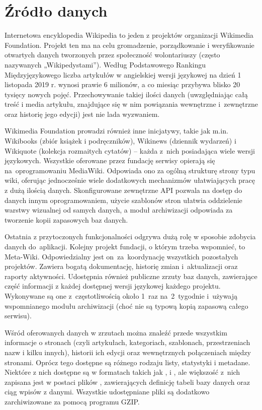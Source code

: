 \section{Źródło danych}
\label{sec:data-source}
Internetowa encyklopedia Wikipedia to jeden z projektów organizacji Wikimedia Foundation. Projekt ten ma na celu gromadzenie, porządkowanie i weryfikowanie otwartych danych tworzonych przez społeczność wolontariuszy (często nazywanych „Wikipedystami”). Według Podstawowego Rankingu Międzyjęzykowego \cite{Wiki:PodstawowyRanking} liczba artykułów w angielskiej wersji językowej na dzień 1 listopada 2019 r. wynosi prawie 6 milionów, a co miesiąc przybywa blisko 20 tysięcy nowych pojęć. Przechowywanie takiej ilości danych (uwzględniając całą treść i media artykułu, znajdujące się w nim powiązania wewnętrzne i~zewnętrzne oraz historię jego edycji) jest nie lada wyzwaniem.

Wikimedia Foundation prowadzi również inne inicjatywy, takie jak m.in. Wikibooks (zbiór książek i podręczników), Wikinews (dziennik wydarzeń) i Wikiquote (kolekcja rozmaitych cytatów) – każda z~nich posiadająca wiele wersji językowych. Wszystkie oferowane przez fundację serwisy opierają się na~oprogramowaniu MediaWiki. Odpowiada ono za ogólną strukturę strony typu wiki, oferując jednocześnie wiele dodatkowych mechanizmów ułatwiających pracę z dużą ilością danych. Skonfigurowane zewnętrzne API pozwala na dostęp do danych innym oprogramowaniem, użycie szablonów stron ułatwia oddzielenie warstwy wizualnej od samych danych, a moduł archiwizacji odpowiada za tworzenie kopii zapasowych baz danych.

Ostatnia z przytoczonych funkcjonalności odgrywa dużą rolę w sposobie zdobycia danych do~aplikacji. Kolejny projekt fundacji, o którym trzeba wspomnieć, to Meta-Wiki. Odpowiedzialny jest on~za~koordynację wszystkich pozostałych projektów. Zawiera bogatą dokumentację, historię zmian i~aktualizacji oraz raporty aktywności. Udostępnia również publiczne zrzuty baz danych, zawierające część informacji z każdej dostępnej wersji językowej każdego projektu. Wykonywane są one z~częstotliwością około 1~raz na~2~tygodnie i~używają wspomnianego modułu archiwizacji (choć nie są typową kopią zapasową całego serwisu).

Wśród oferowanych danych w zrzutach można znaleźć przede wszystkim informacje o stronach (czyli artykułach, kategoriach, szablonach, przestrzeniach nazw i kilku innych), historii ich edycji oraz wewnętrznych połączeniach między stronami. Oprócz tego dostępne są różnego rodzaju listy, statystyki i metadane. Niektóre z nich dostępne są w formatach takich jak ,  i , ale większość z~nich zapisana jest w postaci plików , zawierających definicję tabeli bazy danych oraz ciąg wpisów z danymi. Wszystkie udostępniane pliki są dodatkowo zarchiwizowane za pomocą programu GZIP.